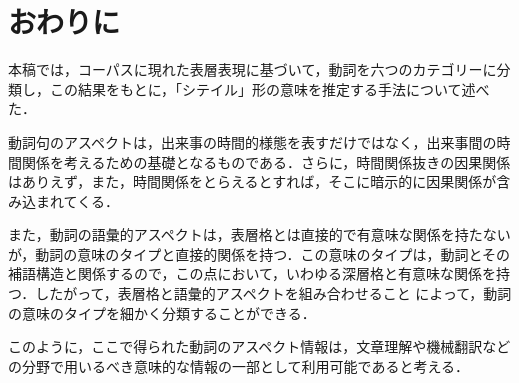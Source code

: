 \section{おわりに}

本稿では，コーパスに現れた表層表現に基づいて，動詞を六つのカテゴリーに分
類し，この結果をもとに，「シテイル」形の意味を推定する手法について述べた．

動詞句のアスペクトは，出来事の時間的様態を表すだけではなく，出来事間の時
間関係を考えるための基礎となるものである．さらに，時間関係抜きの因果関係
はありえず，また，時間関係をとらえるとすれば，そこに暗示的に因果関係が含
み込まれてくる\cite{工藤95}．

また，動詞の語彙的アスペクトは，表層格とは直接的で有意味な関係を持たない
が，動詞の意味のタイプと直接的関係を持つ．この意味のタイプは，動詞とその
補語構造と関係するので，この点において，いわゆる深層格と有意味な関係を持
つ\cite{金子95}．したがって，表層格と語彙的アスペクトを組み合わせること
によって，動詞の意味のタイプを細かく分類することができる\cite{Oishi96ae}．

このように，ここで得られた動詞のアスペクト情報は，文章理解や機械翻訳など
の分野で用いるべき意味的な情報の一部として利用可能であると考える．



